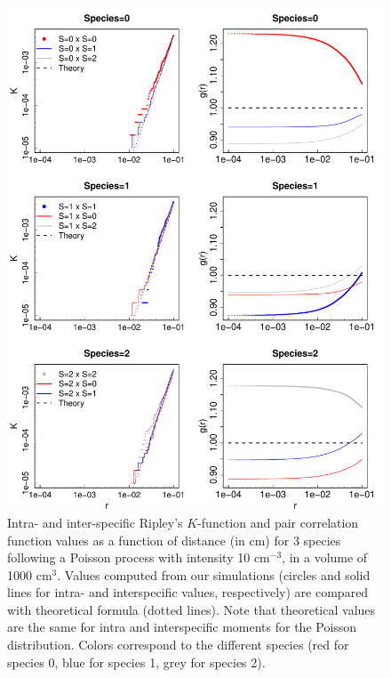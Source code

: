 \documentclass[english]{article}
\begin{document}
\begin{figure}[H]
\begin{centering}
\includegraphics[height=0.85\textheight]{../code/figure/K_PCF_Poisson}
\par\end{centering}
\caption{Intra- and inter-specific Ripley's $K$-function and pair correlation
function values as a function of distance (in cm) for 3 species following
a Poisson process with intensity 10 cm$^{-3}$, in a volume of 1000
cm$^{3}$. Values computed from our simulations (circles and solid
lines for intra- and interspecific values, respectively) are compared
with theoretical formula (dotted lines). Note that theoretical values
are the same for intra and interspecific moments for the Poisson distribution.
Colors correspond to the different species (red for species 0, blue
for species 1, grey for species 2). }
\end{figure}
\end{document}
